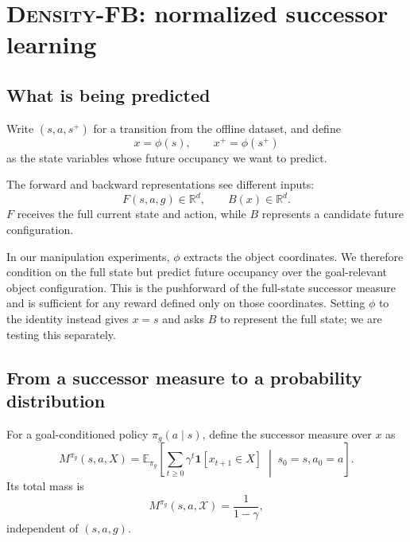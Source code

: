 \documentclass{article}
\newcommand{\E}{\mathbb{E}}
\newcommand{\ind}[1]{\mathbf{1}\!\left[#1\right]}
\newcommand{\DensityFB}{\textsc{Density-FB}}
\begin{document}
\section{\DensityFB: normalized successor learning}
\label{sec:method}

\subsection{What is being predicted}

Write \( (s,a,s^+) \) for a transition from the offline dataset, and define
\begin{equation}
x=\phi(s), \qquad x^+=\phi(s^+)
\end{equation}
as the state variables whose future occupancy we want to predict.

The forward and backward representations see different inputs:
\begin{equation}
\label{eq:fb-args}
F(s,a,g)\in\mathbb R^d, \qquad B(x)\in\mathbb R^d.
\end{equation}
$F$ receives the full current state and action, while $B$ represents a candidate future configuration.

In our manipulation experiments, $\phi$ extracts the object coordinates.
We therefore condition on the full state but predict future occupancy over the goal-relevant object configuration.
This is the pushforward of the full-state successor measure and is sufficient for any reward defined only on those coordinates.
Setting $\phi$ to the identity instead gives $x=s$ and asks $B$ to represent the full state; we are testing this separately.

\subsection{From a successor measure to a probability distribution}

For a goal-conditioned policy $\pi_g(a\mid s)$, define the successor measure over $x$ as
\begin{equation}
    M^{\pi_g}(s,a,X) = \E_{\pi_g} \left[ \sum_{t\ge0} \gamma^t \ind{x_{t+1}\in X} \;\middle|\; s_0=s,a_0=a \right].
\end{equation}
Its total mass is
\begin{equation}
    M^{\pi_g}(s,a,\mathcal X) = \frac{1}{1-\gamma},
\end{equation}
independent of $(s,a,g)$.
\end{document}
